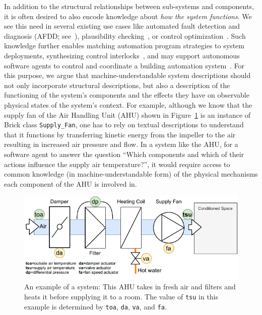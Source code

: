 \documentclass[sigconf]{acmart}
\begin{document}
In addition to the structural relationships between sub-systems and components, it is often desired to also encode knowledge about \textit{how the system functions}.
We see this need in several existing use cases like automated fault detection and diagnosis (AFDD; see~\cite{ramanathan2021assisting}), plausibility checking~\cite{gwerder2022data}, or control optimization~\cite{delgoshaei2017towards}.
Such knowledge further enables matching automation program strategies to system deployments, synthesizing control interlocks~\cite{koziolek2020industrial}, and may support autonomous software agents to control and coordinate a building automation system~\cite{ramanathan2021autonomous}.
%
For this purpose, we argue that machine-understandable system descriptions should not only incorporate structural descriptions, but also a description of the functioning of the system's components and the effects they have on observable physical states of the system's context.
%
For example, although we know that the supply fan of the Air Handling Unit (AHU) shown in Figure~\ref{fig:example-ahu} is an instance of Brick class \texttt{Supply\_Fan}, one has to rely on textual descriptions to understand that it functions by transferring kinetic energy from the impeller to the air resulting in increased air pressure and flow.
%
In a system like the AHU, for a software agent to answer the question ``Which components and which of their actions influence the supply air temperature?'', it would require access to common knowledge (in machine-understandable form) of the physical mechanisms each component of the AHU is involved in.

\begin{figure}[t]
\centering
\includegraphics[width=0.9\linewidth]{figures/i_example_ahu.pdf}
\caption{An example of a system: This AHU takes in fresh air and filters and heats it before supplying it to a room. The value of \texttt{tsu} in this example is determined by \texttt{toa}, \texttt{da}, \texttt{va}, and \texttt{fa}.}
\vspace{-5mm}
\label{fig:example-ahu}
\end{figure}
\end{document}
